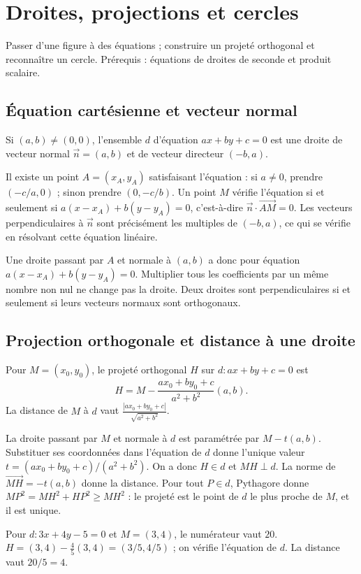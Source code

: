 \documentclass[../cours_1re.tex]{subfiles}
\begin{document}
\setcounter{chapter}{17}
\chapter{Droites, projections et cercles}
\label{ch:18}
\begin{objectif}
Passer d'une figure à des équations ; construire un projeté orthogonal et reconnaître un cercle.
Prérequis : équations de droites de seconde et produit scalaire.
\end{objectif}
\section{Équation cartésienne et vecteur normal}
\begin{propriete}
Si $(a,b)\ne(0,0)$, l'ensemble $d$ d'équation $ax+by+c=0$
est une droite de vecteur normal $\vec n=(a,b)$ et de vecteur directeur
$(-b,a)$.
\end{propriete}
\begin{demonstration}
Il existe un point $A=(x_A,y_A)$ satisfaisant l'équation :
si $a\ne0$, prendre $(-c/a,0)$ ; sinon prendre $(0,-c/b)$.
Un point $M$ vérifie l'équation si et seulement si
$a(x-x_A)+b(y-y_A)=0$, c'est-à-dire $\vec n\cdot\overrightarrow{AM}=0$.
Les vecteurs perpendiculaires à $\vec n$ sont précisément les multiples de
$(-b,a)$, ce qui se vérifie en résolvant cette équation linéaire.
\end{demonstration}
Une droite passant par $A$ et normale à $(a,b)$ a donc pour équation
$a(x-x_A)+b(y-y_A)=0$. Multiplier tous les coefficients par un même
nombre non nul ne change pas la droite.
Deux droites sont perpendiculaires si et seulement si leurs vecteurs
normaux sont orthogonaux.

\section{Projection orthogonale et distance à une droite}
\begin{theoreme}
Pour $M=(x_0,y_0)$, le projeté orthogonal $H$ sur $d:ax+by+c=0$ est
\[
H=M-\frac{ax_0+by_0+c}{a^2+b^2}(a,b).
\]
La distance de $M$ à $d$ vaut
$\displaystyle \frac{|ax_0+by_0+c|}{\sqrt{a^2+b^2}}$.
\end{theoreme}
\begin{demonstration}
La droite passant par $M$ et normale à $d$ est paramétrée par $M-t(a,b)$.
Substituer ses coordonnées dans l'équation de $d$ donne l'unique valeur
$t=(ax_0+by_0+c)/(a^2+b^2)$. On a donc $H\in d$ et $MH\perp d$.
La norme de $\overrightarrow{MH}=-t(a,b)$ donne la distance.
Pour tout $P\in d$, Pythagore donne $MP^2=MH^2+HP^2\ge MH^2$ :
le projeté est le point de $d$ le plus proche de $M$, et il est unique.
\end{demonstration}
\begin{exemple}
Pour $d:3x+4y-5=0$ et $M=(3,4)$, le numérateur vaut $20$.
$H=(3,4)-\frac45(3,4)=(3/5,4/5)$ ; on vérifie l'équation de $d$.
La distance vaut $20/5=4$.
\end{exemple}
\end{document}
